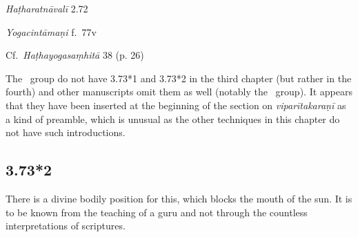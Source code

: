 \begin{ekdosis}
\begin{testimonia}[hp03_073_1]
\emph{Haṭharatnāvalī} 2.72 
\begin{versinnote}
\end{versinnote}
 
\emph{Yogacintāmaṇi} f.~77v
\begin{versinnote}
\end{versinnote}

Cf.~\emph{Haṭhayogasaṃhitā} 38 (p. 26)
\begin{versinnote}
\end{versinnote}
\end{testimonia}

\begin{philcomm}[hp03_073_1]
The \textalpha\ group do not have 3.73*1 and 3.73*2 in the third chapter (but rather in the fourth) and other manuscripts omit them as well (notably the \texteta\ group). It appears that they have been inserted at the beginning of the section on \emph{viparītakaraṇī} as a kind of preamble, which is unusual as the other techniques in this chapter do not have such introductions.


%
\end{philcomm}



\subsection*{3.73*2}
\begin{translation}[hp03_073_2]
There is a divine bodily position for this, which blocks the mouth of the sun. It is to be known from the teaching of a guru and not through the countless interpretations of scriptures.
\end{translation}


\end{ekdosis}
